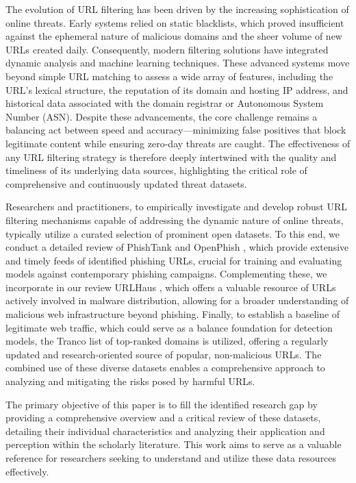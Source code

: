 \documentclass[journal,article,submit,pdftex,moreauthors]{Definitions/mdpi}
\begin{document}
The evolution of URL filtering has been driven by the increasing sophistication of online threats. Early systems relied on static blacklists, which proved insufficient against the ephemeral nature of malicious domains and the sheer volume of new URLs created daily. Consequently, modern filtering solutions have integrated dynamic analysis and machine learning techniques. These advanced systems move beyond simple URL matching to assess a wide array of features, including the URL's lexical structure, the reputation of its domain and hosting IP address, and historical data associated with the domain registrar or Autonomous System Number (ASN). Despite these advancements, the core challenge remains a balancing act between speed and accuracy—minimizing false positives that block legitimate content while ensuring zero-day threats are caught. The effectiveness of any URL filtering strategy is therefore deeply intertwined with the quality and timeliness of its underlying data sources, highlighting the critical role of comprehensive and continuously updated threat datasets.

Researchers and practitioners, to empirically investigate and develop robust URL filtering mechanisms capable of addressing the dynamic nature of online threats, typically utilize a curated selection of prominent open datasets. To this end, we conduct a detailed review of PhishTank \citep{ref-1} and OpenPhish \citep{ref-2}, which provide extensive and timely feeds of identified phishing URLs, crucial for training and evaluating models against contemporary phishing campaigns. Complementing these, we incorporate in our review URLHaus \citep{ref-3}, which offers a valuable resource of URLs actively involved in malware distribution, allowing for a broader understanding of malicious web infrastructure beyond phishing. Finally, to establish a baseline of legitimate web traffic, which could serve as a balance foundation for detection models, the Tranco list \citep{ref-4} of top-ranked domains is utilized, offering a regularly updated and research-oriented source of popular, non-malicious URLs. The combined use of these diverse datasets enables a comprehensive approach to analyzing and mitigating the risks posed by harmful URLs.

The primary objective of this paper is to fill the identified research gap by providing a comprehensive overview and a critical review of these datasets, detailing their individual characteristics and analyzing their application and perception within the scholarly literature. This work aims to serve as a valuable reference for researchers seeking to understand and utilize these data resources effectively.
\end{document}
